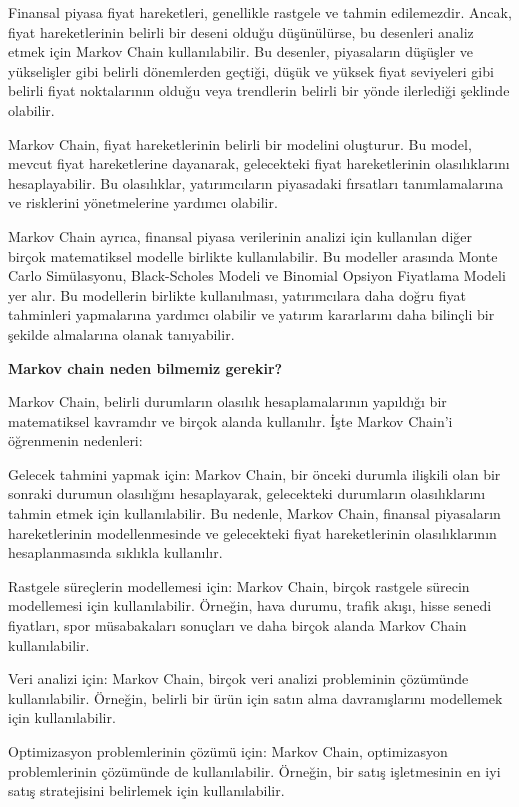 \documentclass[11pt]{article}
\begin{document}
Finansal piyasa fiyat hareketleri, genellikle rastgele ve tahmin edilemezdir. Ancak, fiyat hareketlerinin belirli bir deseni olduğu düşünülürse, bu desenleri analiz etmek için Markov Chain kullanılabilir. Bu desenler, piyasaların düşüşler ve yükselişler gibi belirli dönemlerden geçtiği, düşük ve yüksek fiyat seviyeleri gibi belirli fiyat noktalarının olduğu veya trendlerin belirli bir yönde ilerlediği şeklinde olabilir.

Markov Chain, fiyat hareketlerinin belirli bir modelini oluşturur. Bu model, mevcut fiyat hareketlerine dayanarak, gelecekteki fiyat hareketlerinin olasılıklarını hesaplayabilir. Bu olasılıklar, yatırımcıların piyasadaki fırsatları tanımlamalarına ve risklerini yönetmelerine yardımcı olabilir.

Markov Chain ayrıca, finansal piyasa verilerinin analizi için kullanılan diğer birçok matematiksel modelle birlikte kullanılabilir. Bu modeller arasında Monte Carlo Simülasyonu, Black-Scholes Modeli ve Binomial Opsiyon Fiyatlama Modeli yer alır. Bu modellerin birlikte kullanılması, yatırımcılara daha doğru fiyat tahminleri yapmalarına yardımcı olabilir ve yatırım kararlarını daha bilinçli bir şekilde almalarına olanak tanıyabilir.

\textbf{Markov chain neden bilmemiz gerekir?}

Markov Chain, belirli durumların olasılık hesaplamalarının yapıldığı bir matematiksel kavramdır ve birçok alanda kullanılır. İşte Markov Chain'i öğrenmenin nedenleri:

Gelecek tahmini yapmak için: Markov Chain, bir önceki durumla ilişkili olan bir sonraki durumun olasılığını hesaplayarak, gelecekteki durumların olasılıklarını tahmin etmek için kullanılabilir. Bu nedenle, Markov Chain, finansal piyasaların hareketlerinin modellenmesinde ve gelecekteki fiyat hareketlerinin olasılıklarının hesaplanmasında sıklıkla kullanılır.

Rastgele süreçlerin modellemesi için: Markov Chain, birçok rastgele sürecin modellemesi için kullanılabilir. Örneğin, hava durumu, trafik akışı, hisse senedi fiyatları, spor müsabakaları sonuçları ve daha birçok alanda Markov Chain kullanılabilir.

Veri analizi için: Markov Chain, birçok veri analizi probleminin çözümünde kullanılabilir. Örneğin, belirli bir ürün için satın alma davranışlarını modellemek için kullanılabilir.

Optimizasyon problemlerinin çözümü için: Markov Chain, optimizasyon problemlerinin çözümünde de kullanılabilir. Örneğin, bir satış işletmesinin en iyi satış stratejisini belirlemek için kullanılabilir.
\end{document}
